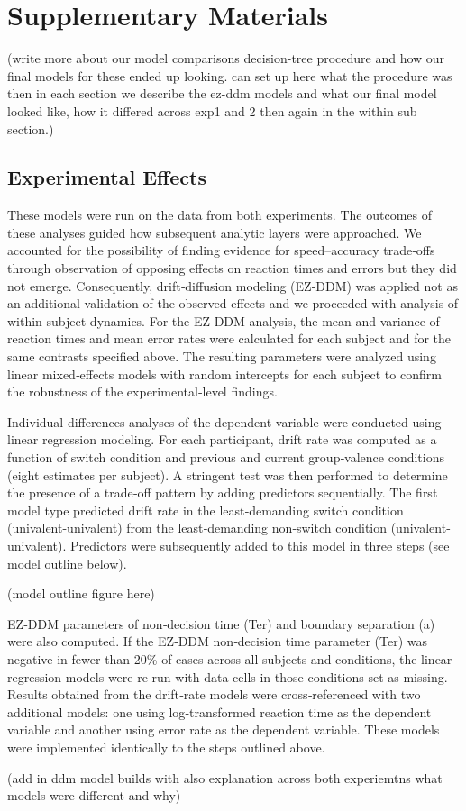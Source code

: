\documentclass[
  english,
  man,floatsintext]{apa6}
\begin{document}
\newpage

\section{Supplementary Materials}\label{supplementary-materials}

(write more about our model comparisons decision-tree procedure and how our final models for these ended up looking. can set up here what the procedure was then in each section we describe the ez-ddm models and what our final model looked like, how it differed across exp1 and 2 then again in the within sub section.)

\subsection{Experimental Effects}\label{experimental-effects}

These models were run on the data from both experiments. The outcomes of these analyses guided how subsequent analytic layers were approached. We accounted for the possibility of finding evidence for speed--accuracy trade‑offs through observation of opposing effects on reaction times and errors but they did not emerge. Consequently, drift‑diffusion modeling (EZ‑DDM) was applied not as an additional validation of the observed effects and we proceeded with analysis of within-subject dynamics. For the EZ‑DDM analysis, the mean and variance of reaction times and mean error rates were calculated for each subject and for the same contrasts specified above. The resulting parameters were analyzed using linear mixed‑effects models with random intercepts for each subject to confirm the robustness of the experimental‑level findings.

Individual differences analyses of the dependent variable were conducted using linear regression modeling. For each participant, drift rate was computed as a function of switch condition and previous and current group‑valence conditions (eight estimates per subject). A stringent test was then performed to determine the presence of a trade‑off pattern by adding predictors sequentially. The first model type predicted drift rate in the least‑demanding switch condition (univalent-univalent) from the least‑demanding non‑switch condition (univalent-univalent). Predictors were subsequently added to this model in three steps (see model outline below).

(model outline figure here)

EZ‑DDM parameters of non‑decision time (Ter) and boundary separation (a) were also computed. If the EZ‑DDM non‑decision time parameter (Ter) was negative in fewer than 20\% of cases across all subjects and conditions, the linear regression models were re‑run with data cells in those conditions set as missing. Results obtained from the drift‑rate models were cross‑referenced with two additional models: one using log‑transformed reaction time as the dependent variable and another using error rate as the dependent variable. These models were implemented identically to the steps outlined above.

(add in ddm model builds with also explanation across both experiemtns what models were different and why)
\end{document}
